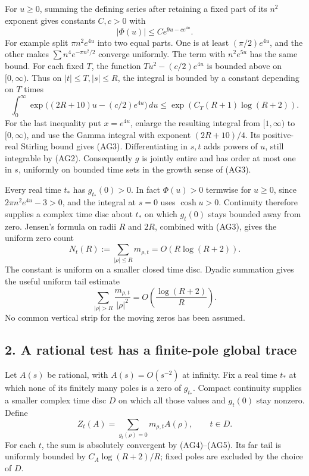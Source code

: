 \documentclass[
  10pt,
  a4paper,
]{article}
\newcounter{none} %
\begin{document}
For \(u\ge0\), summing the defining series after retaining a fixed part
of its \(n^2\) exponent gives constants \(C,c>0\) with \[
|\Phi(u)|\le C e^{9u-ce^{4u}}.
\tag{AG2}
\] For example split \(\pi n^2e^{4u}\) into two equal parts. One is at
least \((\pi/2)e^{4u}\), and the other makes \(\sum n^4e^{-\pi n^2/2}\)
converge uniformly. The term with \(n^2e^{5u}\) has the same bound. For
each fixed \(T\), the function \(Tu^2-(c/2)e^{4u}\) is bounded above on
\([0,\infty)\). Thus on \(|t|\le T, |s|\le R\), the integral is bounded
by a constant depending on \(T\) times \[
\int_0^\infty \exp\bigl((2R+10)u-(c/2)e^{4u}\bigr)\,du
\le \exp(C_T(R+1)\log(R+2)).
\tag{AG3}
\] For the last inequality put \(x=e^{4u}\), enlarge the resulting
integral from \([1,\infty)\) to \([0,\infty)\), and use the Gamma
integral with exponent \((2R+10)/4\). Its positive-real Stirling bound
gives (AG3). Differentiating in \(s,t\) adds powers of \(u\), still
integrable by (AG2). Consequently \(g\) is jointly entire and has order
at most one in \(s\), uniformly on bounded time sets in the growth sense
of (AG3).

Every real time \(t_*\) has \(g_{t_*}(0)>0\). In fact \(\Phi(u)>0\)
termwise for \(u\ge0\), since \(2\pi n^2e^{4u}-3>0\), and the integral
at \(s=0\) uses \(\cosh u>0\). Continuity therefore supplies a complex
time disc about \(t_*\) on which \(g_t(0)\) stays bounded away from
zero. Jensen's formula on radii \(R\) and \(2R\), combined with (AG3),
gives the uniform zero count \[
N_t(R):=\sum_{|\rho|\le R}m_{\rho,t}=O(R\log(R+2)).
\tag{AG4}
\] The constant is uniform on a smaller closed time disc. Dyadic
summation gives the useful uniform tail estimate \[
\sum_{|\rho|>R}\frac{m_{\rho,t}}{|\rho|^2}
=O\left(\frac{\log(R+2)}R\right).
\tag{AG5}
\] No common vertical strip for the moving zeros has been assumed.

\subsection{2. A rational test has a finite-pole global
trace}\label{a-rational-test-has-a-finite-pole-global-trace}

Let \(A(s)\) be rational, with \(A(s)=O(s^{-2})\) at infinity. Fix a
real time \(t_*\) at which none of its finitely many poles is a zero of
\(g_{t_*}\). Compact continuity supplies a smaller complex time disc
\(D\) on which all those values and \(g_t(0)\) stay nonzero. Define \[
Z_t(A)=\sum_{g_t(\rho)=0}m_{\rho,t}A(\rho),\qquad t\in D.
\tag{AG6}
\] For each \(t\), the sum is absolutely convergent by (AG4)--(AG5). Its
far tail is uniformly bounded by \(C_A\log(R+2)/R\); fixed poles are
excluded by the choice of \(D\).
\end{document}
